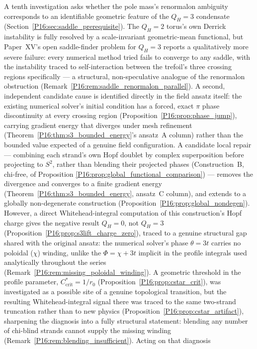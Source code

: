 \documentclass[11pt,a4paper]{article}
\theoremstyle{definition}\newtheorem{definition}[theorem]{Definition}
\theoremstyle{remark}
\theoremstyle{definition}\newtheorem{construction}[theorem]{Construction}
\newcommand{\QH}{Q_H}
\begin{document}
A tenth investigation asks whether the pole mass's renormalon
ambiguity corresponds to an identifiable geometric feature of the
$\QH=3$ condensate (Section~\ref{P16:sec:saddle_prerequisite}). The
$\QH=2$ torus's own Derrick instability is fully resolved by a
scale-invariant geometric-mean functional, but Paper~XV's open
saddle-finder problem for $\QH=3$ reports a qualitatively more severe
failure: every numerical method tried fails to converge to any
saddle, with the instability traced to self-interaction between the
trefoil's three crossing regions specifically --- a structural,
non-speculative analogue of the renormalon obstruction
(Remark~\ref{P16:rem:saddle_renormalon_parallel}). A second, independent
candidate cause is identified directly in the field ansatz itself: the
existing numerical solver's initial condition has a forced, exact
$\pi$ phase discontinuity at every crossing region
(Proposition~\ref{P16:prop:phase_jump}), carrying gradient energy that
diverges under mesh refinement (Theorem~\ref{P16:thm:s3_bounded_energy}'s
ansatz~A column) rather than the bounded value expected of a genuine
field configuration. A candidate local repair --- combining each
strand's own Hopf doublet by complex superposition before projecting
to $S^2$, rather than blending their projected phases (Construction~B,
chi-free, of Proposition \ref{P16:prop:global_functional_comparison}) ---
removes the divergence and converges to a finite gradient
energy (Theorem~\ref{P16:thm:s3_bounded_energy}, ansatz~C column), and
extends to a globally non-degenerate construction
(Proposition~\ref{P16:prop:global_nondegen}).
However, a direct Whitehead-integral computation of this construction's
Hopf charge gives the negative result $\QH=0$, not $\QH=3$
(Proposition~\ref{P16:prop:s3lift_charge_zero}), traced to a genuine
structural gap shared with the original ansatz: the numerical solver's
phase $\theta=3t$ carries no poloidal ($\chi$) winding, unlike the
$\Phi=\chi+3t$ implicit in the profile integrals used analytically
throughout the series (Remark~\ref{P16:rem:missing_poloidal_winding}).
A geometric threshold in the profile parameter, $C^*_{\mathrm{crit}}=1/r_0$
(Proposition~\ref{P16:prop:cstar_crit}), was investigated as a possible
site of a genuine topological transition, but the resulting
Whitehead-integral signal there was traced to the same two-strand
truncation rather than to new physics (Proposition~\ref{P16:prop:cstar_artifact}),
sharpening the diagnosis into a fully structural statement: blending
any number of chi-blind strands cannot supply the missing winding
(Remark~\ref{P16:rem:blending_insufficient}). Acting on that diagnosis
\end{document}
